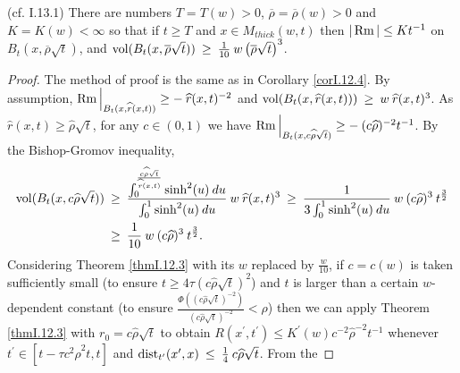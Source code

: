 \begin{theorem}
  \label{thm:kl-thick-thin-decomposition-nonsingular-flows-existence-thick-thin-geometry}
 (cf. I.13.1) \label{thmI.13.1}
There are numbers $T = T(w) > 0$, $\overline{\rho} = \overline{\rho}(w) > 0$
and $K = K(w) < \infty$ so that if $t \ge T$ and
$x \in M_{thick}(w,t)$ then $|\operatorname{Rm}| \le K t^{-1}$ on $B_t(x, \overline{\rho} \sqrt{t})$,
and $\operatorname{vol}(B_t(x, \overline{\rho} \sqrt{t})) \: \ge \: \frac{1}{10} \:
w \left( \overline{\rho} \sqrt{t} \right)^3$.
\end{theorem}
\begin{proof}
The method of proof is the same as in Corollary \ref{corI.12.4}.  By assumption,
$\operatorname{Rm} \Big|_{B_t(x, \widehat{r}(x,t))} \ge - \: \widehat{r}(x,t)^{-2}$ and
$\operatorname{vol}(B_t(x, \widehat{r}(x,t))) \: \ge \: w \: \widehat{r}(x,t)^3$.   As
$\widehat{r}(x,t) \ge \widehat{\rho} \sqrt{t}$, for any $c \in (0,1)$ we have
$\operatorname{Rm} \Big|_{B_t(x, c\widehat{\rho} \sqrt{t})} \ge - \: (c\widehat{\rho})^{-2} t^{-1}$. By
the Bishop-Gromov inequality,
\begin{align}
\operatorname{vol}(B_t(x, c\widehat{\rho} \sqrt{t})) \: & \ge \:
\frac{
\int_0^{ \frac{c \widehat{\rho} \sqrt{t}}{\widehat{r}(x,t)}} \sinh^2(u) \: du}{\int_0^1 \sinh^2(u) \: du}
\: w \: \widehat{r}(x,t)^3
\: \ge \: \frac{1}{3\int_0^1 \sinh^2(u) \: du} \: w \:
(c\widehat{\rho})^3 \: t^{\frac32} \\
& \ge \:  \frac{1}{10} \: w \:
(c\widehat{\rho})^3 \: t^{\frac32}. \notag
\end{align}
Considering Theorem \ref{thmI.12.3} with its $w$ replaced by $\frac{w}{10}$,
if $c = c(w)$ is taken sufficiently small
(to ensure $t \ge 4 \tau (c \widehat{\rho} \sqrt{t})^2$)
and $t$ is larger than a certain
$w$-dependent constant
(to ensure
$\frac{\Phi((c \widehat{\rho} \sqrt{t})^{-2})}{(c
\widehat{\rho} \sqrt{t})^{-2}} <\rho$)
then we can apply Theorem \ref{thmI.12.3} with
$r_0 =  c \widehat{\rho} \sqrt{t}$ to obtain
$R(x^\prime,t^\prime) \le K^\prime(w) c^{-2} \widehat{\rho}^{-2} t^{-1}$  whenever
$t^\prime \in [t - \tau c^2 \widehat{\rho}^2 t, t]$ and
$\operatorname{dist}_{t^\prime}(x^\prime, x) \: \le \: \frac14 \: c \widehat{\rho} \sqrt{t}$. From the

\end{proof}
